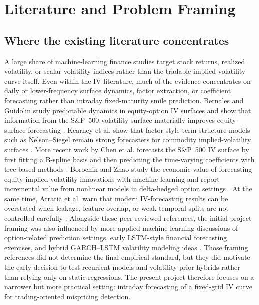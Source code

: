\documentclass[12pt]{report}
\begin{document}
\chapter{Literature and Problem Framing}

\section{Where the existing literature concentrates}
A large share of machine-learning finance studies target stock returns, realized volatility, or scalar volatility indices rather than the tradable implied-volatility curve itself. Even within the IV literature, much of the evidence concentrates on daily or lower-frequency surface dynamics, factor extraction, or coefficient forecasting rather than intraday fixed-maturity smile prediction. Bernales and Guidolin study predictable dynamics in equity-option IV surfaces and show that information from the S\&P~500 volatility surface materially improves equity-surface forecasting \citep{bernales2014}. Kearney et al. show that factor-style term-structure models such as Nelson--Siegel remain strong forecasters for commodity implied-volatility surfaces \citep{kearney2019}. More recent work by Chen et al. forecasts the S\&P~500 IV surface by first fitting a B-spline basis and then predicting the time-varying coefficients with tree-based methods \citep{chen2024bspline}. Borochin and Zhao study the economic value of forecasting equity implied-volatility innovations with machine learning and report incremental value from nonlinear models in delta-hedged option settings \citep{borochin2025}. At the same time, Arratia et al. warn that modern IV-forecasting results can be overstated when leakage, feature overlap, or weak temporal splits are not controlled carefully \citep{arratia2025}. Alongside these peer-reviewed references, the initial project framing was also influenced by more applied machine-learning discussions of option-related prediction settings, early LSTM-style financial forecasting exercises, and hybrid GARCH--LSTM volatility modeling ideas \citep{hull2019framing,sullivan2019lstm,zhao2024garchlstm}. Those framing references did not determine the final empirical standard, but they did motivate the early decision to test recurrent models and volatility-prior hybrids rather than relying only on static regressions. The present project therefore focuses on a narrower but more practical setting: intraday forecasting of a fixed-grid IV curve for trading-oriented mispricing detection.
\end{document}
